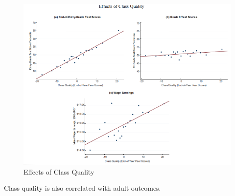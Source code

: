             \begin{figure}[H]
                \centering
                \includegraphics[width=4.5in]{images/ch9/9 chetty 2011 3.png}
                \caption{Effects of Class Quality}
            \end{figure}
            Class quality is also correlated with adult outcomes.
